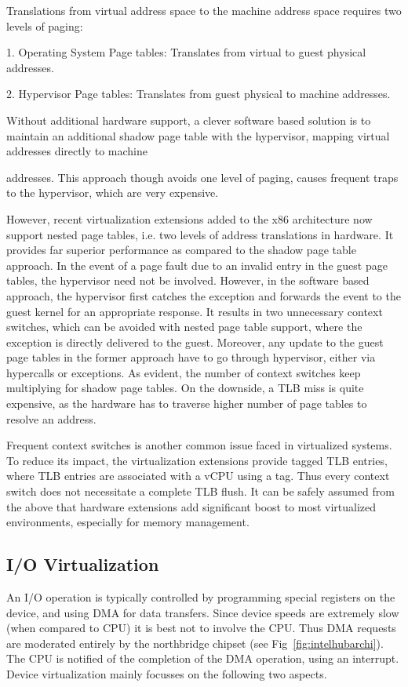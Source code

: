 Translations from virtual address space to the machine address space requires two levels of paging:

1. Operating System Page tables: Translates from virtual to guest physical addresses.

2. Hypervisor Page tables: Translates from guest physical to machine addresses.

Without additional hardware support, a clever software based solution is to maintain an additional shadow page table with the hypervisor, mapping virtual addresses directly to machine

addresses. This approach though avoids one level of paging, causes frequent traps to the hypervisor, which are very expensive.

However, recent virtualization extensions added to the x86 architecture now support nested page tables, i.e. two levels of address translations in hardware. It provides far superior performance as compared to the shadow page table approach. In the event of a page fault due to an invalid entry in the guest page tables, the hypervisor need not be involved. However, in the software based approach, the hypervisor first catches the exception and forwards the event to the guest kernel for an appropriate response. It results in two unnecessary context switches, which can be avoided with nested page table support, where the exception is directly delivered to the guest. Moreover, any update to the guest page tables in the former approach have to go through hypervisor, either via hypercalls or exceptions. As evident, the number of context switches keep multiplying for shadow page tables. On the downside, a TLB miss is quite expensive, as the hardware has to traverse higher number of page tables to resolve an address.

Frequent context switches is another common issue faced in virtualized systems. To reduce its impact, the virtualization extensions provide tagged TLB entries, where TLB entries are associated with a vCPU using a tag. Thus every context switch does not necessitate a complete TLB flush. It can be safely assumed from the above that hardware extensions add significant boost to most virtualized environments, especially for memory management.

\subsection{I/O Virtualization}
An I/O operation is typically controlled by programming special registers on the device, and using DMA for data transfers. Since device speeds are extremely slow (when compared to CPU) it is best not to involve the CPU. Thus DMA requests are moderated entirely by the northbridge chipset (see Fig~\ref{fig:intelhubarchi}). The CPU is notified of the completion of the DMA operation, using an interrupt. Device virtualization mainly focusses on the following two aspects.

